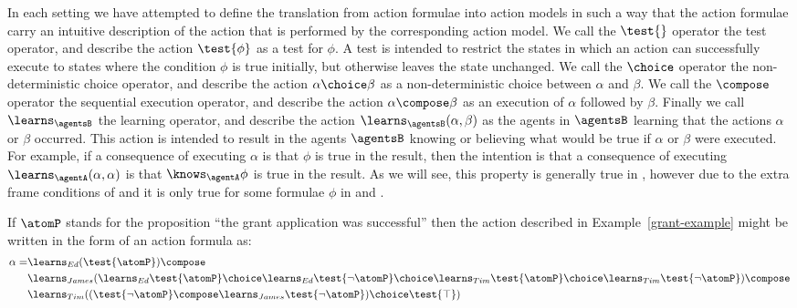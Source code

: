 \documentclass[twoside]{aiml14}
\begin{document}
  In each setting we have attempted to define the translation from action
  formulae into action models in such a way that the action formulae carry an
  intuitive description of the action that is performed by the corresponding
  action model. We call the $\test{}$ operator the test operator, and describe
  the action $\test{\phi}$ as a test for $\phi$. A test is intended to restrict
  the states in which an action can successfully execute to states where the
  condition $\phi$ is true initially, but otherwise leaves the state unchanged. 
  We call the $\choice$ operator the non-deterministic choice operator, and
  describe the action $\alpha \choice \beta$ as a non-deterministic choice
  between $\alpha$ and $\beta$. We call the $\compose$ operator the sequential
  execution operator, and describe the action $\alpha \compose \beta$ as an
  execution of $\alpha$ followed by $\beta$.  Finally we call $\learns_\agentsB$
  the learning operator, and describe the action $\learns_\agentsB (\alpha,
  \beta)$ as the agents in $\agentsB$ learning that the actions $\alpha$ or
  $\beta$ occurred.  
  This action is intended to result in the agents $\agentsB$
  knowing or believing what would be true if $\alpha$ or $\beta$ were executed.
  For example, if a consequence of executing $\alpha$ is that $\phi$ is true in
  the result, then the intention is that a consequence of executing
  $\learns_\agentA (\alpha, \alpha)$ is that $\knows_\agentA \phi$ is true in
  the result.  As we will see, this property is generally true in \logicAflK{},
  however due to the extra frame conditions of \classKFF{} and \classS{} it is
  only true for some formulae $\phi$ in \logicAflKFF{} and \logicAflS{}.

  \begin{example}\label{grant-example-formula}
      If $\atomP$ stands for the proposition ``the grant application was
      successful'' then the action described in Example~\ref{grant-example}
      might be written in the form of an action formula as:
      \begin{align*}
          \alpha = &\learns_{Ed} (\test{\atomP}) \compose\\
          &\learns_{James} (\learns_{Ed} \test{\atomP} \choice \learns_{Ed} \test{\neg \atomP} \choice \learns_{Tim} \test{\atomP} \choice \learns_{Tim} \test{\neg \atomP}) \compose\\
          &\learns_{Tim} ((\test{\neg \atomP} \compose \learns_{James} \test{\neg \atomP}) \choice \test{\top})
      \end{align*}
  \end{example}
\end{document}
